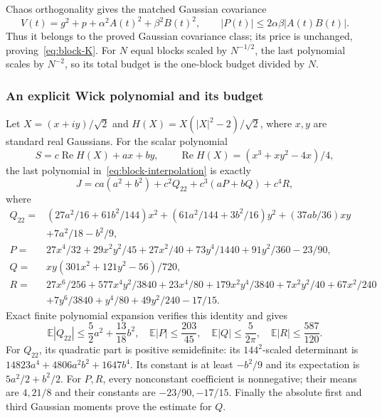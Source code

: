 Chaos orthogonality gives the matched Gaussian covariance
\[
 V(t)=g^2+p+\alpha^2A(t)^2+\beta^2B(t)^2,
 \qquad |P(t)|\le2\alpha\beta|A(t)B(t)|.
\]
Thus it belongs to the proved Gaussian covariance class; its price is
unchanged, proving~\eqref{eq:block-K}. For $N$ equal blocks scaled by
$N^{-1/2}$, the last polynomial scales by $N^{-2}$, so its total
budget is the one-block budget divided by $N$.

\subsubsection{An explicit Wick polynomial and its budget}
Let $X=(x+iy)/\sqrt2$ and
$H(X)=X(|X|^2-2)/\sqrt2$, where $x,y$ are standard real Gaussians.
For the scalar polynomial
\[
 S=c\operatorname{Re}H(X)+ax+by,
 \qquad \operatorname{Re}H(X)=(x^3+xy^2-4x)/4,
\]
the last polynomial in~\eqref{eq:block-interpolation} is exactly
\[
 J=ca(a^2+b^2)+c^2Q_{22}+c^3(aP+bQ)+c^4R,
\]
where
\begin{align*}
Q_{22}={}&(27a^2/16+61b^2/144)x^2
 +(61a^2/144+3b^2/16)y^2+(37ab/36)xy\\
 &+7a^2/18-b^2/9,\\
P={}&27x^4/32+29x^2y^2/45+27x^2/40
       +73y^4/1440+91y^2/360-23/90,\\
Q={}&xy(301x^2+121y^2-56)/720,\\
R={}&27x^6/256+577x^4y^2/3840+23x^4/80
 +179x^2y^4/3840+7x^2y^2/40+67x^2/240\\
 &+7y^6/3840+y^4/80+49y^2/240-17/15.
\end{align*}
Exact finite polynomial expansion verifies this identity and gives
\[
 \mathbb E|Q_{22}|\le\frac52a^2+\frac{13}{18}b^2,
 \quad \mathbb E|P|\le\frac{203}{45},
 \quad \mathbb E|Q|\le\frac5{2\pi},
 \quad \mathbb E|R|\le\frac{587}{120}.
\]
For $Q_{22}$, its quadratic part is positive semidefinite: its
$144^2$-scaled determinant is
$14823a^4+4806a^2b^2+1647b^4$.
Its constant is at least $-b^2/9$ and its expectation is
$5a^2/2+b^2/2$. For $P,R$, every nonconstant coefficient is
nonnegative; their means are $4,21/8$ and their constants are
$-23/90,-17/15$. Finally the absolute first and third Gaussian moments
prove the estimate for $Q$.

